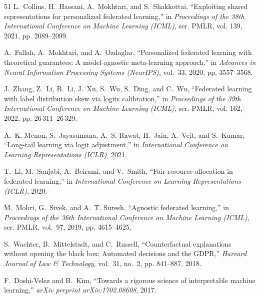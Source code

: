 \documentclass[journal]{IEEEtran}
\theoremstyle{definition}
\begin{document}
\begin{thebibliography}{51}
L.~Collins, H.~Hassani, A.~Mokhtari, and S.~Shakkottai, ``Exploiting shared
  representations for personalized federated learning,'' in \emph{Proceedings
  of the 38th International Conference on Machine Learning (ICML)}, ser. PMLR,
  vol. 139, 2021, pp. 2089--2099.

A.~Fallah, A.~Mokhtari, and A.~Ozdaglar, ``Personalized federated learning with
  theoretical guarantees: A model-agnostic meta-learning approach,'' in
  \emph{Advances in Neural Information Processing Systems (NeurIPS)}, vol.~33,
  2020, pp. 3557--3568.

J.~Zhang, Z.~Li, B.~Li, J.~Xu, S.~Wu, S.~Ding, and C.~Wu, ``Federated learning
  with label distribution skew via logits calibration,'' in \emph{Proceedings
  of the 39th International Conference on Machine Learning (ICML)}, ser. PMLR,
  vol. 162, 2022, pp. 26\,311--26\,329.

A.~K. Menon, S.~Jayasumana, A.~S. Rawat, H.~Jain, A.~Veit, and S.~Kumar,
  ``Long-tail learning via logit adjustment,'' in \emph{International
  Conference on Learning Representations (ICLR)}, 2021.

T.~Li, M.~Sanjabi, A.~Beirami, and V.~Smith, ``Fair resource allocation in
  federated learning,'' in \emph{International Conference on Learning
  Representations (ICLR)}, 2020.

M.~Mohri, G.~Sivek, and A.~T. Suresh, ``Agnostic federated learning,'' in
  \emph{Proceedings of the 36th International Conference on Machine Learning
  (ICML)}, ser. PMLR, vol.~97, 2019, pp. 4615--4625.

S.~Wachter, B.~Mittelstadt, and C.~Russell, ``Counterfactual explanations
  without opening the black box: Automated decisions and the {GDPR},''
  \emph{Harvard Journal of Law \& Technology}, vol.~31, no.~2, pp. 841--887,
  2018.

F.~Doshi-Velez and B.~Kim, ``Towards a rigorous science of interpretable
  machine learning,'' \emph{arXiv preprint arXiv:1702.08608}, 2017.


\end{thebibliography}
\end{document}
